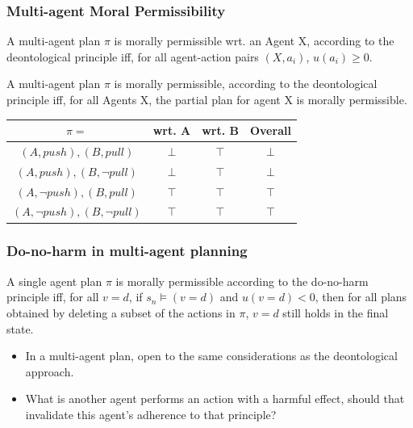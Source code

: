 \documentclass{beamer}
\begin{document}
\begin{frame}
\frametitle{Multi-agent Moral Permissibility}
\begin{definition}
A multi-agent plan $\pi$ is morally permissible wrt. an Agent X, according to the deontological principle iff, for all agent-action pairs $(X,a_i)$, $u(a_i) \geq 0$.
\end{definition}

\begin{definition}
A multi-agent plan $\pi$ is morally permissible, according to the deontological principle iff, for all Agents X, the partial plan for agent X is morally permissible.
\end{definition}


\begin{center}
\begin{tabular}{ |c|c|c|c| } 
 \hline
 $\pi=$ & wrt. A & wrt. B & Overall \\ 
 \hline
 $(A,push), (B, pull)$ & $\bot$ & $\top$ & $\bot$\\ 
 \hline
 $(A,push), (B, \lnot pull)$ & $\bot$ & $\top$ & $\bot$\\ 
 \hline
 $(A,\lnot push), (B, pull)$ & $\top$ & $\top$ & $\top$\\ 
 \hline
 $(A,\lnot push), (B, \lnot pull)$ & $\top$ & $\top$ & $\top$\\ 
 \hline
\end{tabular}
\end{center}

\end{frame}




\begin{frame}
\frametitle{Do-no-harm in multi-agent planning}
\begin{definition}
A single agent plan $\pi$ is morally permissible according to the do-no-harm principle iff, for all $v=d$, if $s_n \models (v=d)$ and $u(v=d)<0$, then for all plans obtained by deleting a subset of the actions in $\pi$, $v=d$ still holds in the final state.
\end{definition}

\begin{itemize}
\item In a multi-agent plan, open to the same considerations as the deontological approach.
\item What is another agent performs an action with a harmful effect, should that invalidate this agent's adherence to that principle?
\end{itemize}


\end{frame}
\end{document}

